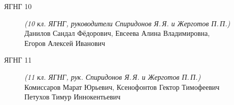 \begin{description}
\item[ЯГНГ 10] \textit{(10 кл. ЯГНГ, руководители Спиридонов Я.\,Я. и Жерготов П.\,П.)} \\
Данилов Сандал Фёдорович, Евсеева Алина Владимировна, \\
Егоров Алексей Иванович

\item[ЯГНГ 11] \textit{(11 кл. ЯГНГ, рук. Спиридонов Я.\,Я. и Жерготов П.\,П.)} \\
Комиссаров Марат Юрьевич, Ксенофонтов Гектор Тимофеевич \\
Петухов Тимур Иннокентьевич

\end{description}